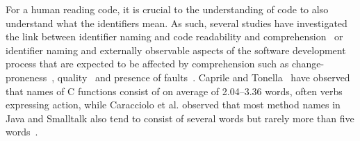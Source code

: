 \documentclass[conference]{IEEEtran}
\newcommand{\quotes}[1]{\textit{``#1''}}
\begin{document}
For a human reading code, it is crucial to the understanding of code to also understand what the identifiers mean. As such, several studies have investigated the link between identifier naming and code readability and comprehension~\cite{AvidanF17,HofmeisterSH17,LawrieMFB07,TakangGM96,Teasley} or identifier naming and externally observable aspects of the software development process that are expected to be affected by comprehension such as change-proneness~\cite{AmanASK15}, quality~\cite{ButlerWYS10,LunguK13} and presence of faults~\cite{ScannielloR13,TramontanaRS14}.
Caprile and Tonella~\cite{CaprileTonella} have observed that names of C functions consist of on average of 2.04--3.36 words, often verbs expressing action, while Caracciolo et al. observed that most method names in Java and Smalltalk also tend to consist of several words but rarely more than five words~\cite{Caracciolo}.
%
\end{document}
